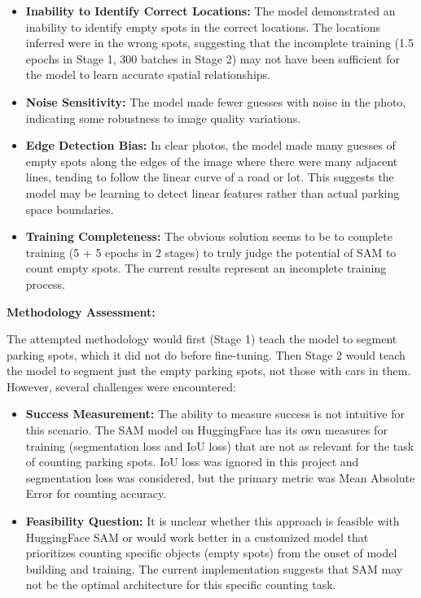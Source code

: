 \documentclass[12pt,a4paper]{article}
\begin{document}
\begin{itemize}
    \item \textbf{Inability to Identify Correct Locations:} The model demonstrated an inability to identify empty spots in the correct locations. The locations inferred were in the wrong spots, suggesting that the incomplete training (1.5 epochs in Stage 1, 300 batches in Stage 2) may not have been sufficient for the model to learn accurate spatial relationships.
    \item \textbf{Noise Sensitivity:} The model made fewer guesses with noise in the photo, indicating some robustness to image quality variations.
    \item \textbf{Edge Detection Bias:} In clear photos, the model made many guesses of empty spots along the edges of the image where there were many adjacent lines, tending to follow the linear curve of a road or lot. This suggests the model may be learning to detect linear features rather than actual parking space boundaries.
    \item \textbf{Training Completeness:} The obvious solution seems to be to complete training (5 + 5 epochs in 2 stages) to truly judge the potential of SAM to count empty spots. The current results represent an incomplete training process.
\end{itemize}

\textbf{Methodology Assessment:}

The attempted methodology would first (Stage 1) teach the model to segment parking spots, which it did not do before fine-tuning. Then Stage 2 would teach the model to segment just the empty parking spots, not those with cars in them. However, several challenges were encountered:

\begin{itemize}
    \item \textbf{Success Measurement:} The ability to measure success is not intuitive for this scenario. The SAM model on HuggingFace has its own measures for training (segmentation loss and IoU loss) that are not as relevant for the task of counting parking spots. IoU loss was ignored in this project and segmentation loss was considered, but the primary metric was Mean Absolute Error for counting accuracy.
    \item \textbf{Feasibility Question:} It is unclear whether this approach is feasible with HuggingFace SAM or would work better in a customized model that prioritizes counting specific objects (empty spots) from the onset of model building and training. The current implementation suggests that SAM may not be the optimal architecture for this specific counting task.
\end{itemize}
\end{document}
